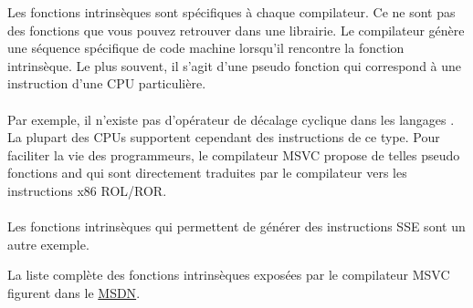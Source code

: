 ﻿
\label{sec:compiler_intrinsic}


Les fonctions intrinsèques sont spécifiques à chaque compilateur. Ce ne sont pas des fonctions que 
vous pouvez retrouver dans une librairie.
Le compilateur génère une séquence spécifique de code machine lorsqu'il rencontre la fonction 
intrinsèque. Le plus souvent, il s'agit d'une pseudo fonction qui correspond à une instruction d'une 
\ac{CPU} particulière. \\
\\
Par exemple, il n'existe pas d'opérateur de décalage cyclique dans les langages \CCpp. La plupart 
des \ac{CPU}s supportent cependant des instructions de ce type.
Pour faciliter la vie des programmeurs, le compilateur MSVC propose de telles pseudo fonctions
 and \FNMSDNROTxURL{}
qui sont directement traduites par le compilateur vers les instructions x86 ROL/ROR. \\
\\
Les fonctions intrinsèques qui permettent de générer des instructions SSE sont un autre exemple.

La liste complète des fonctions intrinsèques exposées par le compilateur MSVC figurent dans le 
\href{http://go.yurichev.com/17254}{MSDN}.

